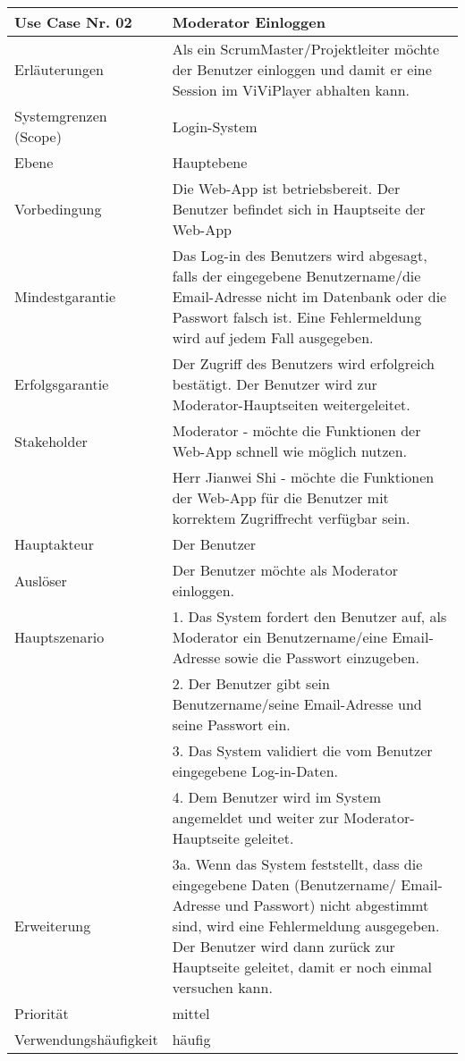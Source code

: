 \begin{tabularx}{\linewidth}{|l|X|}
	\hline
	Use Case Nr. 02			& \textbf{Moderator Einloggen} \\ \hline
	Erläuterungen			& Als ein ScrumMaster/Projektleiter möchte der Benutzer einloggen und
							  damit er eine Session im ViViPlayer abhalten kann.  
							  \\ \hline
	Systemgrenzen (Scope)	& Login-System \\ \hline
	Ebene					& Hauptebene \\ \hline
	Vorbedingung			& Die Web-App ist betriebsbereit. Der Benutzer befindet sich in
							  Hauptseite der Web-App \\ \hline
	Mindestgarantie			& Das Log-in des Benutzers wird abgesagt, falls der eingegebene
							  Benutzername/die Email-Adresse nicht im Datenbank oder die Passwort falsch ist. Eine Fehlermeldung wird auf jedem Fall ausgegeben.
							  \\ \hline
	Erfolgsgarantie			& Der Zugriff des Benutzers wird erfolgreich bestätigt. Der
							  Benutzer wird zur Moderator-Hauptseiten weitergeleitet. 
							  \\ \hline
	Stakeholder				& Moderator - möchte die Funktionen der Web-App schnell 
							  wie möglich nutzen. \\
							& Herr Jianwei Shi - möchte die Funktionen der Web-App für die Benutzer 
							  mit korrektem Zugriffrecht  verfügbar sein.\\ \hline
	Hauptakteur				& Der Benutzer \\ \hline
	Auslöser				& Der Benutzer möchte als Moderator einloggen.
							  \\ \hline	
	Hauptszenario			& 1. Das System fordert den Benutzer auf, als Moderator ein
							  Benutzername/eine Email-Adresse sowie die Passwort einzugeben. \\
							& 2. Der Benutzer gibt sein Benutzername/seine Email-Adresse und seine
							  Passwort ein. \\
							& 3. Das System validiert die vom Benutzer eingegebene
							  Log-in-Daten. \\
							& 4. Dem Benutzer wird im System angemeldet und weiter zur
							  Moderator-Hauptseite geleitet. \\ \hline
	Erweiterung				& 3a. Wenn das System feststellt, dass die eingegebene Daten (Benutzername/
							  Email-Adresse und Passwort) nicht abgestimmt sind, wird eine Fehlermeldung 
							  ausgegeben. Der Benutzer wird dann zurück zur Hauptseite geleitet, damit
							  er noch einmal versuchen kann.
							  \\ \hline
	Priorität				& mittel \\ \hline
	Verwendungshäufigkeit	& häufig \\ \hline
\end{tabularx}
